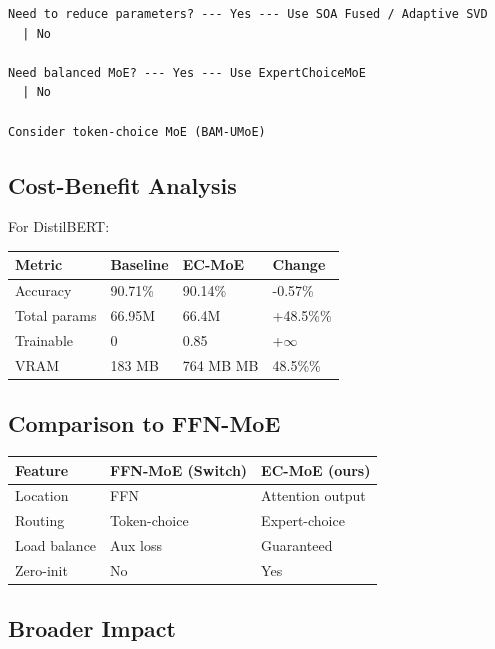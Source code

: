 \begin{lstlisting}
Need to reduce parameters? --- Yes --- Use SOA Fused / Adaptive SVD
  | No
   
Need balanced MoE? --- Yes --- Use ExpertChoiceMoE
  | No
   
Consider token-choice MoE (BAM-UMoE)
\end{lstlisting}

\subsection{Cost-Benefit Analysis}

For DistilBERT:

\begin{table}[H]
\centering
\small
\begin{tabular}{llll}
\toprule
\textbf{Metric} & \textbf{Baseline} & \textbf{EC-MoE} & \textbf{Change} \\
\midrule
Accuracy & 90.71\% & 90.14\% & -0.57\% \\
Total params & 66.95M & 66.4M & +48.5\%\% \\
Trainable & 0 & 0.85 & +$\infty$ \\
VRAM & 183 MB & 764 MB MB & 48.5\%\% \\
\bottomrule
\end{tabular}
\end{table}

\subsection{Comparison to FFN-MoE}

\begin{table}[H]
\centering
\small
\begin{tabular}{lll}
\toprule
\textbf{Feature} & \textbf{FFN-MoE (Switch)} & \textbf{EC-MoE (ours)} \\
\midrule
Location & FFN & Attention output \\
Routing & Token-choice & Expert-choice \\
Load balance & Aux loss & Guaranteed \\
Zero-init & No & Yes \\
\bottomrule
\end{tabular}
\end{table}

\subsection{Broader Impact}

